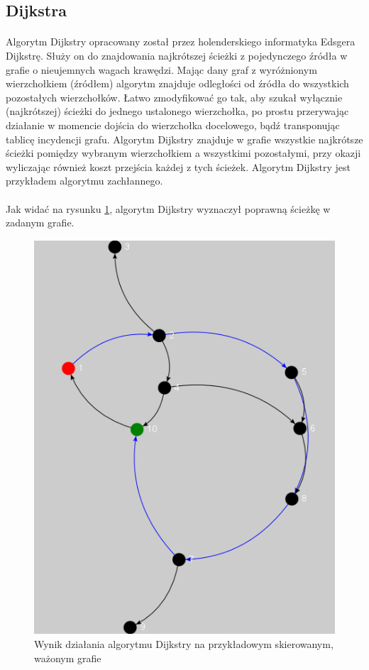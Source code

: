 \subsection{Dijkstra}
\paragraph{}
Algorytm Dijkstry opracowany został przez holenderskiego informatyka Edsgera Dijkstrę.
Służy on do znajdowania najkrótszej ścieżki z pojedynczego źródła w grafie o nieujemnych wagach krawędzi.
Mając dany graf z wyróżnionym wierzchołkiem (źródłem) algorytm znajduje odległości od źródła do wszystkich pozostałych wierzchołków. 
Łatwo zmodyfikować go tak, aby szukał wyłącznie (najkrótszej) ścieżki do jednego ustalonego wierzchołka, po prostu przerywając działanie w momencie
dojścia do wierzchołka docelowego, bądź transponując tablicę incydencji grafu.
Algorytm Dijkstry znajduje w grafie wszystkie najkrótsze ścieżki pomiędzy wybranym wierzchołkiem a wszystkimi pozostałymi, przy okazji wyliczając
również koszt przejścia każdej z tych ścieżek.
Algorytm Dijkstry jest przykładem algorytmu zachłannego.


\paragraph{}
Jak widać na rysunku \ref{fig:dijkstra}, algorytm Dijkstry wyznaczył poprawną ścieżkę w zadanym grafie.

\begin{figure}[!h]
 \centering
 \includegraphics{algorithms/dijkstra}
 \caption{Wynik działania algorytmu Dijkstry na przykładowym skierowanym, ważonym grafie}
 \label{fig:dijkstra}
\end{figure}

